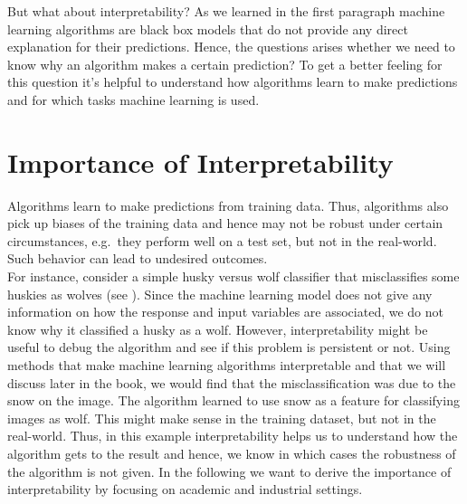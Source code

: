 \documentclass[
]{krantz}
\begin{document}
But what about interpretability? As we learned in the first paragraph machine learning algorithms are black box models that do not provide any direct explanation for their predictions. Hence, the questions arises whether we need to know why an algorithm makes a certain prediction? To get a better feeling for this question it's helpful to understand how algorithms learn to make predictions and for which tasks machine learning is used.

\hypertarget{importance-of-interpretability}{%
\section{Importance of Interpretability}\label{importance-of-interpretability}}

Algorithms learn to make predictions from training data. Thus, algorithms also pick up biases of the training data and hence may not be robust under certain circumstances, e.g.~they perform well on a test set, but not in the real-world. Such behavior can lead to undesired outcomes.\\
For instance, consider a simple husky versus wolf classifier that misclassifies some huskies as wolves (see \citet{ribeiro2016should}). Since the machine learning model does not give any information on how the response and input variables are associated, we do not know why it classified a husky as a wolf. However, interpretability might be useful to debug the algorithm and see if this problem is persistent or not. Using methods that make machine learning algorithms interpretable and that we will discuss later in the book, we would find that the misclassification was due to the snow on the image. The algorithm learned to use snow as a feature for classifying images as wolf. This might make sense in the training dataset, but not in the real-world. Thus, in this example interpretability helps us to understand how the algorithm gets to the result and hence, we know in which cases the robustness of the algorithm is not given. In the following we want to derive the importance of interpretability by focusing on academic and industrial settings.
\end{document}
